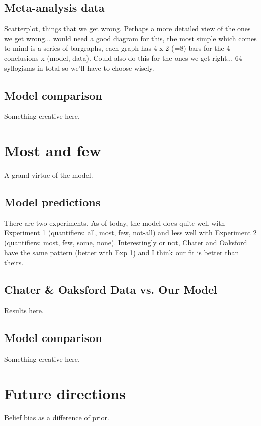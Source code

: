 \documentclass[10pt,letterpaper]{article}
\begin{document}
\subsection{Meta-analysis data}
Scatterplot, things that we get wrong. Perhaps a more detailed view of the ones we get wrong... would need a good diagram for this, the most simple which comes to mind is a series of bargraphs, each graph has 4 x 2 (=8) bars for the 4 conclusions x (model, data). Could also do this for the ones we get right... 64 syllogisms in total so we'll have to choose wisely.


\subsection{Model comparison}

Something creative here.

\section{Most and few}

A grand virtue of the model. 

\subsection{Model predictions}

There are two experiments. As of today, the model does quite well with Experiment 1 (quantifiers: all, most, few, not-all) and less well with Experiment 2 (quantifiers: most, few, some, none). Interestingly or not, Chater and Oaksford have the same pattern (better with Exp 1) and I think our fit is better than theirs.

\subsection{Chater \& Oaksford Data vs. Our Model}

Results here.

\subsection{Model comparison}

Something creative here.

\section{Future directions}

Belief bias as a difference of prior.



\setlength{\bibleftmargin}{.125in}
\setlength{\bibindent}{-\bibleftmargin}


\end{document}
